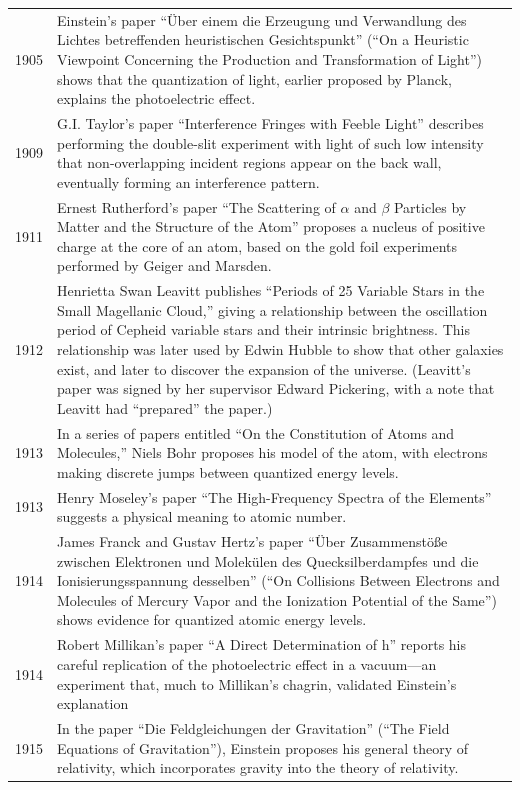 \documentclass[../../main.tex]{subfiles}
\begin{document}
\begin{center}
\begin{longtable}{p{}  p{}}
1905&Einstein's paper “Über einem die Erzeugung und Verwandlung des Lichtes betreffenden heuristischen Gesichtspunkt” (“On a Heuristic Viewpoint Concerning the Production and Transformation of Light”) shows that the quantization of light, earlier proposed by Planck, explains the photoelectric effect.\\
1909&G.I. Taylor's paper “Interference Fringes with Feeble Light” describes performing the double-slit experiment with light of such low intensity that non-overlapping incident regions appear on the back wall, eventually forming an interference pattern.\\
1911&Ernest Rutherford's paper “The Scattering of $\alpha$ and $\beta$ Particles by Matter and the Structure of the Atom” proposes a nucleus of positive charge at the core of an atom, based on the gold foil experiments performed by Geiger and Marsden.\\
1912&Henrietta Swan Leavitt publishes “Periods of 25 Variable Stars in the Small Magellanic Cloud,” giving a relationship between the oscillation period of Cepheid variable stars and their intrinsic brightness. This relationship was later used by Edwin Hubble to show that other galaxies exist, and later to discover the expansion of the universe. (Leavitt's paper was signed by her supervisor Edward Pickering, with a note that Leavitt had “prepared” the paper.)\\
1913&In a series of papers entitled “On the Constitution of Atoms and Molecules,” Niels Bohr proposes his model of the atom, with electrons making discrete jumps between quantized energy levels.\\
1913&Henry Moseley's paper “The High-Frequency Spectra of the Elements” suggests a physical meaning to atomic number. \\
1914&James Franck and Gustav Hertz's paper “Über Zusammenstöße zwischen Elektronen und Molekülen des Quecksilberdampfes und die Ionisierungsspannung desselben” (“On Collisions Between Electrons and Molecules of Mercury Vapor and the Ionization Potential of the Same”) shows evidence for quantized atomic energy levels.\\
1914&Robert Millikan's paper “A Direct Determination of h” reports his careful replication of the photoelectric effect in a vacuum—an experiment that, much to Millikan's chagrin, validated Einstein's explanation\\
1915&In the paper “Die Feldgleichungen der Gravitation” (“The Field Equations of Gravitation”), Einstein proposes his general theory of relativity, which incorporates gravity into the theory of relativity.\\

\end{longtable}
\end{center}
\end{document}
